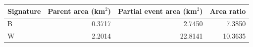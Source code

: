 \begin{tabular}{lrrr}\toprule Signature & Parent area (km$^2$) & Partial event area (km$^2$) & Area ratio\\\midrule
B & 0.3717 & 2.7450 & 7.3850 \\
W & 2.2014 & 22.8141 & 10.3635 \\
\bottomrule\end{tabular}